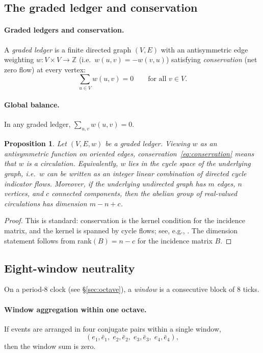 \documentclass[11pt,reqno]{amsart}
\theoremstyle{plain}
\newtheorem{proposition}[theorem]{Proposition}
\theoremstyle{definition}
\theoremstyle{remark}
\newcommand{\ZZ}{\mathbb{Z}}
\newcommand{\1}{\mathbf{1}}
\begin{document}
\subsection{The graded ledger and conservation} \paragraph{Graded ledgers and conservation.}\label{def:graded-ledger}
A \emph{graded ledger} is a finite directed graph $(V,E)$ with an antisymmetric edge weighting $w:V\times V\to\ZZ$ (i.e.\ $w(u,v)=-w(v,u)$) satisfying \emph{conservation} (net zero flow) at every vertex:
\begin{equation}\label{eq:conservation}
\sum_{u\in V} w(u,v)=0 \qquad \text{for all } v\in V.
\end{equation}
 

\paragraph{Global balance.}\label{prop:global-balance}
In any graded ledger,
$\sum_{u,v}w(u,v)=0$.

\begin{proposition}\label{prop:cycle-space}
Let $(V,E,w)$ be a graded ledger. Viewing $w$ as an antisymmetric function on
oriented edges, conservation~\eqref{eq:conservation} means that $w$ is a
\emph{circulation}. Equivalently, $w$ lies in the cycle space of the underlying
graph, i.e.\ $w$ can be written as an integer linear combination of directed
cycle indicator flows.
Moreover, if the underlying undirected graph has $m$ edges, $n$ vertices, and
$c$ connected components, then the abelian group of real-valued circulations has
dimension $m-n+c$.
\end{proposition}

\begin{proof}
This is standard: conservation is the kernel condition for the incidence
matrix, and the kernel is spanned by cycle flows; see, e.g., \cite[\S~1.9]{diestel2017}.
The dimension statement follows from rank$(B)=n-c$ for the incidence matrix $B$.
\end{proof}

\subsection{Eight-window neutrality} On a period-8 clock (see \S\ref{sec:octave}), a \emph{window} is a
consecutive block of 8 ticks. \paragraph{Window aggregation within one octave.}\label{prop:window}
If events are arranged in four conjugate pairs within a single window,
\[ (e_1,\bar e_1,\;e_2,\bar e_2,\;e_3,\bar e_3,\;e_4,\bar e_4),
\]
then the window sum is zero.
\end{document}
